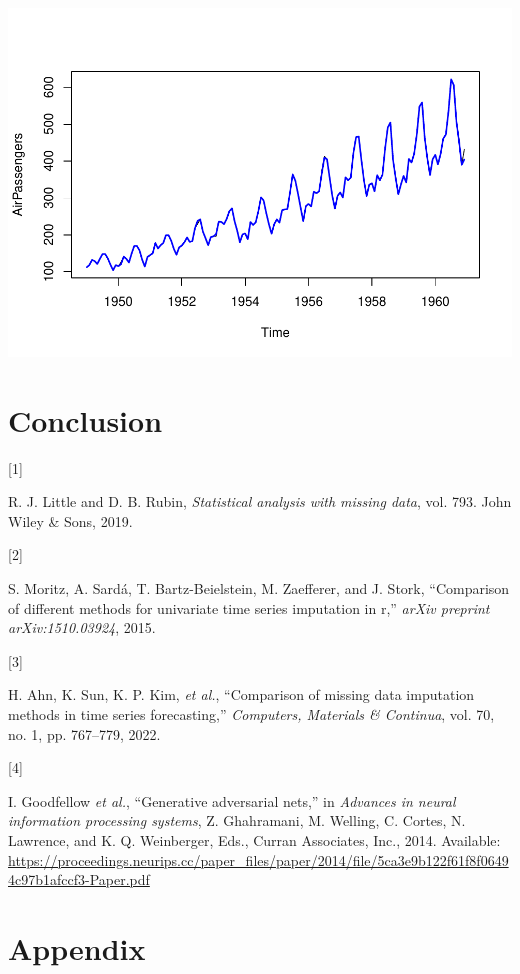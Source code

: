 \documentclass[
]{report}
\newlength{\cslhangindent}
\newlength{\csllabelwidth}
\newenvironment{CSLReferences}[2] %
 {\begin{list}{}{%
  \setlength{\itemindent}{0pt}
  \setlength{\leftmargin}{0pt}
  \setlength{\parsep}{0pt}
  \ifodd #1
   \setlength{\leftmargin}{\cslhangindent}
   \setlength{\itemindent}{-1\cslhangindent}
  \fi
  \setlength{\itemsep}{#2\baselineskip}}}
 {\end{list}}
\newcommand{\CSLLeftMargin}[1]{\parbox[t]{\csllabelwidth}{\strut#1\strut}}
\newcommand{\CSLRightInline}[1]{\parbox[t]{\linewidth - \csllabelwidth}{\strut#1\strut}}
\begin{document}
\includegraphics{ProjectReport_files/figure-latex/unnamed-chunk-18-1.pdf}


\chapter{Conclusion}\label{conclusion}

\label{refs}
\begin{CSLReferences}{0}{0}
\CSLLeftMargin{{[}1{]} }%
\CSLRightInline{R. J. Little and D. B. Rubin, \emph{Statistical analysis
with missing data}, vol. 793. John Wiley \& Sons, 2019.}

\CSLLeftMargin{{[}2{]} }%
\CSLRightInline{S. Moritz, A. Sardá, T. Bartz-Beielstein, M. Zaefferer,
and J. Stork, {``Comparison of different methods for univariate time
series imputation in r,''} \emph{arXiv preprint arXiv:1510.03924},
2015.}

\CSLLeftMargin{{[}3{]} }%
\CSLRightInline{H. Ahn, K. Sun, K. P. Kim, \emph{et al.}, {``Comparison
of missing data imputation methods in time series forecasting,''}
\emph{Computers, Materials \& Continua}, vol. 70, no. 1, pp. 767--779,
2022.}

\CSLLeftMargin{{[}4{]} }%
\CSLRightInline{I. Goodfellow \emph{et al.}, {``Generative adversarial
nets,''} in \emph{Advances in neural information processing systems}, Z.
Ghahramani, M. Welling, C. Cortes, N. Lawrence, and K. Q. Weinberger,
Eds., Curran Associates, Inc., 2014. Available:
\url{https://proceedings.neurips.cc/paper_files/paper/2014/file/5ca3e9b122f61f8f06494c97b1afccf3-Paper.pdf}}

\end{CSLReferences}

\chapter{Appendix}\label{appendix}
\end{document}
